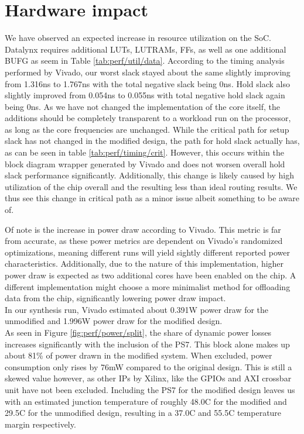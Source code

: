 \documentclass[../bachelor_paper.tex]{subfiles}
\begin{document}
\chapter{Hardware impact}
    \label{ch:perf}
    
We have observed an expected increase in resource utilization on the \ac{SoC}. Datalynx requires additional \acp{LUT}, \acsp{LUTRAM}, \acp{FF}, as well as one additional \ac{BUFG} as seem in Table \ref{tab:perf/util/data}. According to the timing analysis performed by Vivado, our worst slack stayed about the same slightly improving from 1.316ns to 1.767ns with the total negative slack being 0ns. Hold slack also slightly improved from 0.054ns to 0.055ns with total negative hold slack again being 0ns. As we have not changed the implementation of the core itself, the additions should be completely transparent to a workload run on the processor, as long as the core frequencies are unchanged. While the critical path for setup slack has not changed in the modified design, the path for hold slack actually has, as can be seen in table \ref{tab:perf/timing/crit}. However, this occurs within the block diagram wrapper generated by Vivado and does not worsen overall hold slack performance significantly. Additionally, this change is likely caused by high utilization of the chip overall and the resulting less than ideal routing results. We thus see this change in critical path as a minor issue albeit something to be aware of.

Of note is the increase in power draw according to Vivado. This metric is far from accurate, as these power metrics are dependent on Vivado's randomized optimizations, meaning different runs will yield sightly different reported power characteristics. Additionally, due to the nature of this implementation, higher power draw is expected as two additional cores have been enabled on the chip. A different implementation might choose a more minimalist method for offloading data from the chip, significantly lowering power draw impact.\\
In our synthesis run, Vivado estimated about 0.391W power draw for the unmodified and 1.996W power draw for the modified design. \\
As seen in Figure \ref{fig:perf/power/split}, the share of dynamic power losses increases significantly with the inclusion of the \ac{PS7}. This block alone makes up about 81\% of power drawn in the modified system. When excluded, power consumption only rises by 76mW compared to the original design. This is still a skewed value however, as other \acp{IP} by Xilinx, like the GPIOs and AXI crossbar unit have not been excluded. Including the \ac{PS7} for the modified design leaves us with an estimated junction temperature of roughly 48.0\textdegree C for the modified and 29.5\textdegree C for the unmodified design, resulting in a 37.0\textdegree C and 55.5\textdegree C temperature margin respectively.
\end{document}
